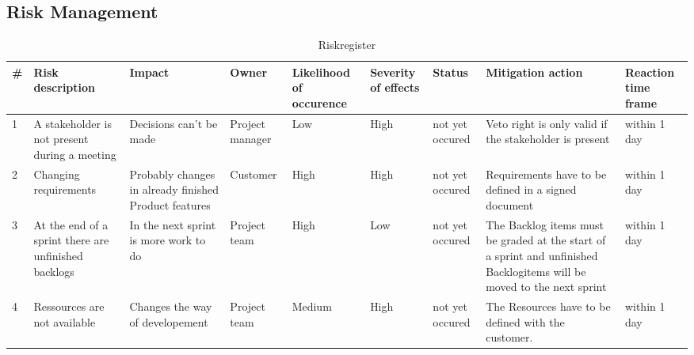     \subsection{Risk Management}
    \begin{table}[H]
        \centering
        \label{my-label}
        \begin{tabular}{|l|l|l|l|l|l|l|l|l|}
        \hline
        \textbf{\#} & \textbf{Risk description}                            & \textbf{Impact}                                      & \textbf{Owner}  & \textbf{Likelihood of occurence} & \textbf{Severity of effects} & \textbf{Status} & \textbf{Mitigation action}                                                                                            & \textbf{Reaction time frame} \\ \hline
        1               & A stakeholder is not present during a meeting        & Decisions can't be made                              & Project manager & Low                              & High                         & not yet occured & Veto right is only valid if the stakeholder is present                                                                & within 1 day                 \\ \hline
        2               & Changing requirements                                & Probably changes in already finished Product features & Customer        & High                             & High                         & not yet occured & Requirements have to be defined in a signed document                                                                  & within 1 day                 \\ \hline
        3               & At the end of a sprint there are unfinished backlogs & In the next sprint is more work to do                & Project team    & High                             & Low                          & not yet occured & The Backlog items must be graded at the start of a sprint and unfinished Backlogitems will be moved to the next sprint & within 1 day                 \\ \hline
        4               & Ressources are not available                         & Changes the way of developement                      & Project team    & Medium                           & High                         & not yet occured & The Resources have to be defined with the customer.                                                                  & within 1 day                 \\ \hline
        \end{tabular}
        \caption{Riskregister}
        \end{table}
        